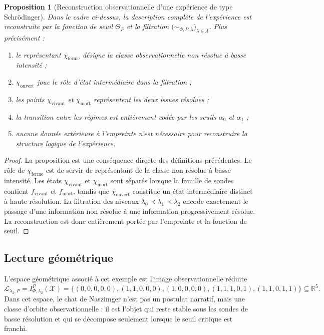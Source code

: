 \documentclass[11pt,a4paper,openany]{book}
\newtheorem{proposition}[definition]{Proposition}
\begin{document}
\begin{proposition}[Reconstruction observationnelle d'une expérience de type Schrödinger]
Dans le cadre ci-dessus, la description complète de l'expérience est reconstruite par la fonction de seuil \(\Theta_P\) et la filtration \(\bigl(\sim_{\Phi,P,\lambda}\bigr)_{\lambda\in\Lambda}\). Plus précisément :
\begin{enumerate}[label=\arabic*.]
\item le représentant \(\chi_{\mathrm{ferme}}\) désigne la classe observationnelle non résolue à basse intensité ;
\item \(\chi_{\mathrm{ouvert}}\) joue le rôle d'état intermédiaire dans la filtration ;
\item les points \(\chi_{\mathrm{vivant}}\) et \(\chi_{\mathrm{mort}}\) représentent les deux issues résolues ;
\item la transition entre les régimes est entièrement codée par les seuils \(\alpha_0\) et \(\alpha_1\) ;
\item aucune donnée extérieure à l'empreinte n'est nécessaire pour reconstruire la structure logique de l'expérience.
\end{enumerate}
\end{proposition}

\begin{proof}
La proposition est une conséquence directe des définitions précédentes. Le rôle de \(\chi_{\mathrm{ferme}}\) est de servir de représentant de la classe non résolue à basse intensité. Les états \(\chi_{\mathrm{vivant}}\) et \(\chi_{\mathrm{mort}}\) sont séparés lorsque la famille de sondes contient \(f_{\mathrm{vivant}}\) et \(f_{\mathrm{mort}}\), tandis que \(\chi_{\mathrm{ouvert}}\) constitue un état intermédiaire distinct à haute résolution. La filtration des niveaux \(\lambda_0\prec\lambda_1\prec\lambda_2\) encode exactement le passage d'une information non résolue à une information progressivement résolue. La reconstruction est donc entièrement portée par l'empreinte et la fonction de seuil.
\end{proof}

\subsection{Lecture géométrique}

L'espace géométrique associé à cet exemple est l'image observationnelle réduite
\[
\mathcal L_{\lambda_2,P}=I_{\Phi,\lambda_2}^P(\mathcal X)
=
\bigl\{
(0,0,0,0,0),
(1,1,0,0,0),
(1,0,0,0,0),
(1,1,1,0,1),
(1,1,0,1,1)
\bigr\}
\subseteq \mathbb R^5.
\]
Dans cet espace, le chat de Naszimger n'est pas un postulat narratif, mais une classe d'orbite observationnelle : il est l'objet qui reste stable sous les sondes de basse résolution et qui se décompose seulement lorsque le seuil critique est franchi.
\end{document}
